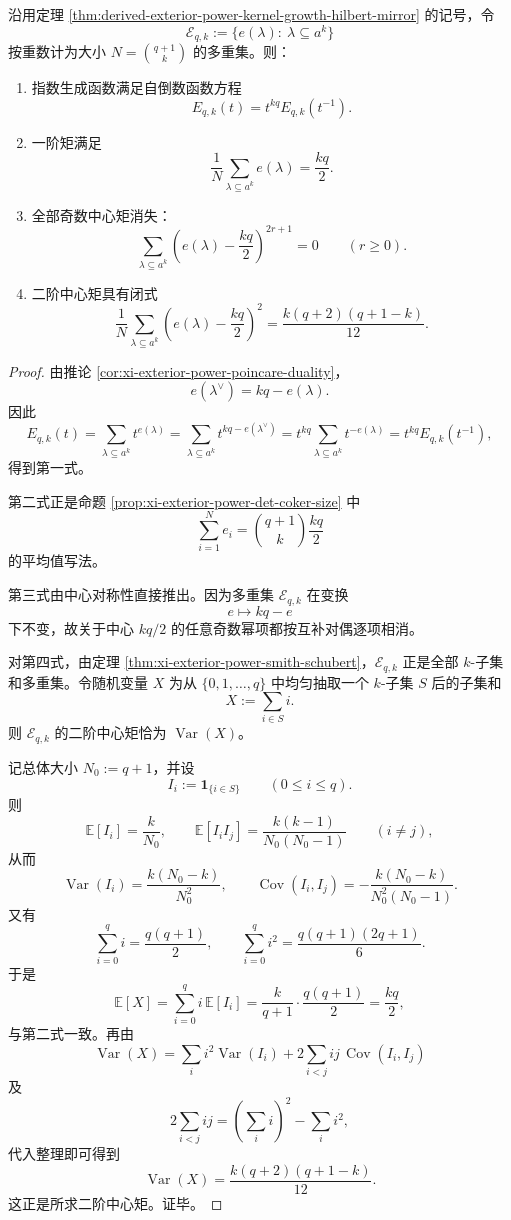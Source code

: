 \begin{theorem}\label{thm:derived-schubert-smith-selfdual-moment-law}
沿用定理 \ref{thm:derived-exterior-power-kernel-growth-hilbert-mirror} 的记号，令
\[
\mathcal E_{q,k}:=\{e(\lambda):\ \lambda\subseteq a^k\}
\]
按重数计为大小 \(N=\binom{q+1}{k}\) 的多重集。则：
\begin{enumerate}
  \item 指数生成函数满足自倒数函数方程
  \[
  E_{q,k}(t)=t^{kq}E_{q,k}(t^{-1}).
  \]
  \item 一阶矩满足
  \[
  \frac1N\sum_{\lambda\subseteq a^k}e(\lambda)=\frac{kq}{2}.
  \]
  \item 全部奇数中心矩消失：
  \[
  \sum_{\lambda\subseteq a^k}\left(e(\lambda)-\frac{kq}{2}\right)^{2r+1}=0
  \qquad (r\ge 0).
  \]
  \item 二阶中心矩具有闭式
  \[
  \frac1N\sum_{\lambda\subseteq a^k}\left(e(\lambda)-\frac{kq}{2}\right)^2
  =
  \frac{k(q+2)(q+1-k)}{12}.
  \]
\end{enumerate}
\end{theorem}
\begin{proof}
由推论 \ref{cor:xi-exterior-power-poincare-duality}，
\[
e(\lambda^\vee)=kq-e(\lambda).
\]
因此
\[
E_{q,k}(t)
=
\sum_{\lambda\subseteq a^k}t^{e(\lambda)}
=
\sum_{\lambda\subseteq a^k}t^{kq-e(\lambda^\vee)}
=
t^{kq}\sum_{\lambda\subseteq a^k}t^{-e(\lambda)}
=
t^{kq}E_{q,k}(t^{-1}),
\]
得到第一式。

第二式正是命题 \ref{prop:xi-exterior-power-det-coker-size} 中
\[
\sum_{i=1}^{N}e_i
=
\binom{q+1}{k}\frac{kq}{2}
\]
的平均值写法。

第三式由中心对称性直接推出。因为多重集 \(\mathcal E_{q,k}\) 在变换
\[
e\longmapsto kq-e
\]
下不变，故关于中心 \(kq/2\) 的任意奇数幂项都按互补对偶逐项相消。

对第四式，由定理 \ref{thm:xi-exterior-power-smith-schubert}，\(\mathcal E_{q,k}\) 正是全部 \(k\)-子集和多重集。令随机变量 \(X\) 为从 \(\{0,1,\dots,q\}\) 中均匀抽取一个 \(k\)-子集 \(S\) 后的子集和
\[
X:=\sum_{i\in S} i.
\]
则 \(\mathcal E_{q,k}\) 的二阶中心矩恰为 \(\operatorname{Var}(X)\)。

记总体大小 \(N_0:=q+1\)，并设
\[
I_i:=\mathbf 1_{\{i\in S\}}
\qquad (0\le i\le q).
\]
则
\[
\mathbb E[I_i]=\frac{k}{N_0},
\qquad
\mathbb E[I_iI_j]=\frac{k(k-1)}{N_0(N_0-1)}
\qquad (i\ne j),
\]
从而
\[
\operatorname{Var}(I_i)=\frac{k(N_0-k)}{N_0^2},
\qquad
\operatorname{Cov}(I_i,I_j)=-\frac{k(N_0-k)}{N_0^2(N_0-1)}.
\]
又有
\[
\sum_{i=0}^{q} i=\frac{q(q+1)}{2},
\qquad
\sum_{i=0}^{q} i^2=\frac{q(q+1)(2q+1)}{6}.
\]
于是
\[
\mathbb E[X]=\sum_{i=0}^{q}i\,\mathbb E[I_i]
=
\frac{k}{q+1}\cdot \frac{q(q+1)}{2}
=
\frac{kq}{2},
\]
与第二式一致。再由
\[
\operatorname{Var}(X)=\sum_i i^2\operatorname{Var}(I_i)+2\sum_{i<j}ij\,\operatorname{Cov}(I_i,I_j)
\]
及
\[
2\sum_{i<j}ij
=
\left(\sum_i i\right)^2-\sum_i i^2,
\]
代入整理即可得到
\[
\operatorname{Var}(X)=\frac{k(q+2)(q+1-k)}{12}.
\]
这正是所求二阶中心矩。证毕。
\end{proof}

